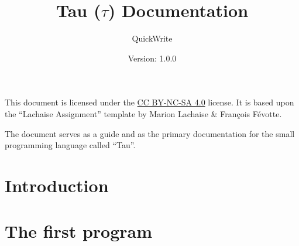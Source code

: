 \documentclass[a4paper]{article}
\title{Tau ($\tau$) Documentation} %
\author{QuickWrite} %
\date{Version: 1.0.0} %
\newcommand{\importsection}[2]{\newpage
\section{#2}
}
\begin{document}
\maketitle %

This document is licensed under the \href{https://creativecommons.org/licenses/by-nc-sa/4.0/}{CC BY-NC-SA 4.0} license. 
It is based upon the ``Lachaise Assignment'' template by Marion Lachaise \& François Févotte.

The document serves as a guide and as the primary documentation for the small programming language called ``Tau''.

\tableofcontents

\importsection{sections/introduction}{Introduction}

\importsection{sections/first-program}{The first program}
\end{document}
